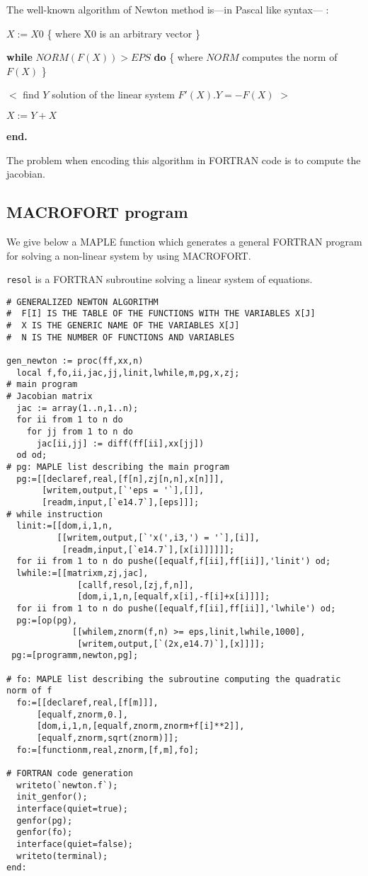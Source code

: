 The well-known algorithm of Newton method 
is---in Pascal like syntax--- :\smallskip\par
$X:=X0$ \{ where X0 is an arbitrary vector \} \par
{\bf while} $NORM(F(X)) > EPS$ {\bf do} \{ where $NORM$ computes the norm
  of $F(X)$ \} \par
\quad $<$ find $Y$ solution of the linear system $F'(X).Y =-F(X)$ $>$ \par
\quad $X:=Y+X$ \par
{\bf end.}

The problem when encoding this algorithm in FORTRAN code is to compute
the jacobian.

\subsection{MACROFORT program}

We give below a MAPLE function which generates a general FORTRAN program
for solving a non-linear system by using MACROFORT.

{\tt resol} is a FORTRAN subroutine solving a linear system of equations.

\begin{verbatim}
# GENERALIZED NEWTON ALGORITHM
#  F[I] IS THE TABLE OF THE FUNCTIONS WITH THE VARIABLES X[J]
#  X IS THE GENERIC NAME OF THE VARIABLES X[J]
#  N IS THE NUMBER OF FUNCTIONS AND VARIABLES 

gen_newton := proc(ff,xx,n)
  local f,fo,ii,jac,jj,linit,lwhile,m,pg,x,zj;
# main program
# Jacobian matrix
  jac := array(1..n,1..n);
  for ii from 1 to n do
    for jj from 1 to n do
      jac[ii,jj] := diff(ff[ii],xx[jj])
  od od;
# pg: MAPLE list describing the main program
  pg:=[[declaref,real,[f[n],zj[n,n],x[n]]],
       [writem,output,[`'eps = '`],[]],
       [readm,input,[`e14.7`],[eps]]];
# while instruction
  linit:=[[dom,i,1,n,
          [[writem,output,[`'x(',i3,') = '`],[i]],
           [readm,input,[`e14.7`],[x[i]]]]]];
  for ii from 1 to n do pushe([equalf,f[ii],ff[ii]],'linit') od;
  lwhile:=[[matrixm,zj,jac],
              [callf,resol,[zj,f,n]],
              [dom,i,1,n,[equalf,x[i],-f[i]+x[i]]]];
  for ii from 1 to n do pushe([equalf,f[ii],ff[ii]],'lwhile') od;
  pg:=[op(pg),
             [[whilem,znorm(f,n) >= eps,linit,lwhile,1000],
              [writem,output,[`(2x,e14.7)`],[x]]]];
 pg:=[programm,newton,pg];

# fo: MAPLE list describing the subroutine computing the quadratic norm of f
  fo:=[[declaref,real,[f[m]]],
      [equalf,znorm,0.],
      [dom,i,1,n,[equalf,znorm,znorm+f[i]**2]],
      [equalf,znorm,sqrt(znorm)]];
  fo:=[functionm,real,znorm,[f,m],fo];

# FORTRAN code generation
  writeto(`newton.f`);
  init_genfor();
  interface(quiet=true);
  genfor(pg);
  genfor(fo);
  interface(quiet=false);
  writeto(terminal);
end:
\end{verbatim}

